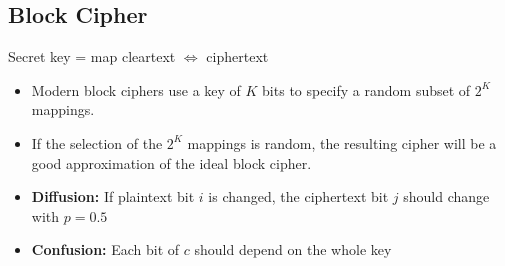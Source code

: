 \subsection{Block Cipher}
Secret key = map cleartext $\Leftrightarrow$ ciphertext
\begin{itemize}
	\item Modern block ciphers use a key of $K$ bits to specify a random
subset of $2^K$ mappings.
\item If the selection of the $2^K$ mappings is random, the resulting
cipher will be a good approximation of the ideal block cipher.
\item \textbf{Diffusion:} If plaintext bit $i$ is changed, the ciphertext bit $j$ should
  change with $p=0.5$
\item \textbf{Confusion:} Each bit of $c$ should depend on the whole key
\end{itemize}

